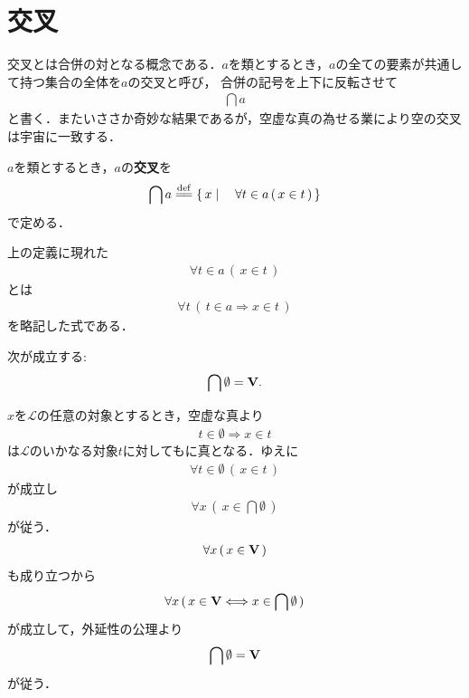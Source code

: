 \section{交叉}
	交叉とは合併の対となる概念である．$a$を類とするとき，$a$の全ての要素が共通して持つ集合の全体を$a$の交叉と呼び，
	合併の記号を上下に反転させて
	\begin{align}
		\bigcap a
	\end{align}
	と書く．またいささか奇妙な結果であるが，空虚な真の為せる業により空の交叉は宇宙に一致する．
	
	\begin{screen}
		\begin{dfn}[交叉]
			$a$を類とするとき，$a$の{\bf 交叉}を
			\begin{align}
				\bigcap a \defeq \Set{x}{\forall t \in a\, (\, x \in t\, )}
			\end{align}
			で定める．
		\end{dfn}
	\end{screen}
	
	上の定義に現れた
	\begin{align}
		\forall t \in a\, (\, x \in t\, )
	\end{align}
	とは
	\begin{align}
		\forall t\, (\, t \in a \Longrightarrow x \in t\, )
	\end{align}
	を略記した式である．
	
	\begin{screen}
		\begin{thm}[空集合の交叉は宇宙となる]\label{thm:union_of_the_emptyset_is_the_Universe}
			次が成立する:
			\begin{align}
				\bigcap \emptyset = \mathbf{V}.
			\end{align}
		\end{thm}
	\end{screen}
	
	\begin{prf}
		$x$を$\mathcal{L}$の任意の対象とするとき，空虚な真より
		\begin{align}
			t \in \emptyset \Longrightarrow x \in t
		\end{align}
		は$\mathcal{L}$のいかなる対象$t$に対してもに真となる．ゆえに
		\begin{align}
			\forall t \in \emptyset\, (\, x \in t\, )
		\end{align}
		が成立し
		\begin{align}
			\forall x\, (\, x \in \bigcap \emptyset\, )
		\end{align}
		が従う．
		\begin{align}
			\forall x\, (\, x \in \mathbf{V}\, )
		\end{align}
		も成り立つから
		\begin{align}
			\forall x\, (\, x \in \mathbf{V} \Longleftrightarrow x \in \bigcap \emptyset\, )
		\end{align}
		が成立して，外延性の公理より
		\begin{align}
			\bigcap \emptyset = \mathbf{V}
		\end{align}
		が従う．
		\QED
	\end{prf}
	
